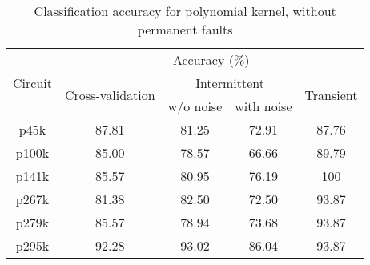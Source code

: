 \begin{table}[h]

	\captionsetup{justification=centering}
\begin{tabular}{ccccc}
\hline
\multirow{3}{*}{Circuit} & \multicolumn{4}{c}{Accuracy (\%)}\\ \cline{2-5} 
                         & \multirow{2}{*}{Cross-validation} & \multicolumn{2}{c}{Intermittent} & \multirow{2}{*}{Transient} \\ \cline{3-4}
                         &                                   & w/o noise      & with noise      &                            \\ \hline
p45k                     & 87.81                             & 81.25          & 72.91           & 87.76                      \\
p100k                    & 85.00                             & 78.57          & 66.66           & 89.79                      \\
p141k                    & 85.57                             & 80.95          & 76.19           & 100                        \\
p267k                    & 81.38                             & 82.50          & 72.50           & 93.87                      \\
p279k                    & 85.57                             & 78.94          & 73.68           & 93.87                      \\
p295k                    & 92.28                             & 93.02          & 86.04           & 93.87                      \\
\hline
\end{tabular}
\caption {Classification accuracy for polynomial kernel, without permanent faults}
\label{tab:polywop}
\end{table}



